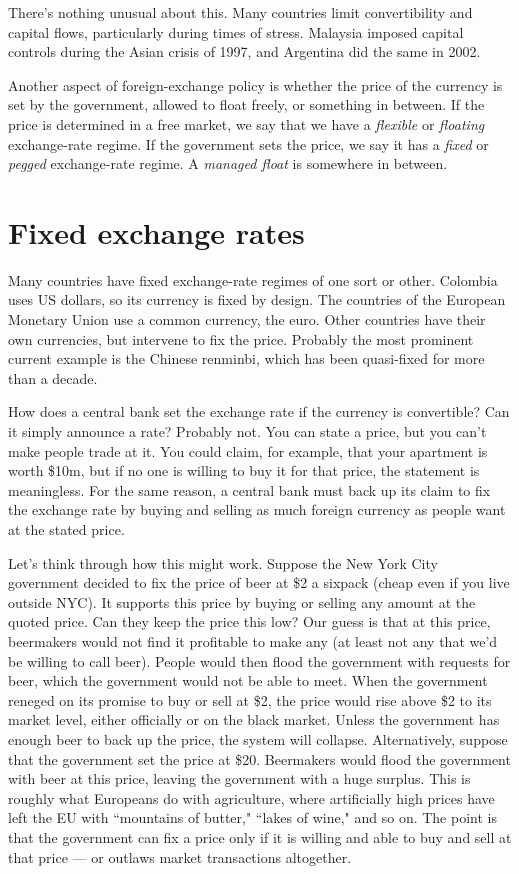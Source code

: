 There's nothing unusual about this.
Many countries limit convertibility and capital flows,
particularly during times of stress.
Malaysia imposed capital controls during the Asian crisis of 1997,
and Argentina did the same in 2002.

Another aspect of foreign-exchange policy
is whether the price of the currency is set by the government,
allowed to float freely, or something in between.
If the price is determined in a free market, we say that we have a
{\it flexible\/} or {\it floating\/} exchange-rate regime.
If the government sets the price, we say it has a
{\it fixed\/} or {\it pegged\/} exchange-rate regime.
A {\it managed float\/} is somewhere in between.


\section{Fixed exchange rates}

Many countries have fixed exchange-rate regimes of one sort or other.
Colombia uses US dollars, so its currency is fixed by design. %
The countries of the European Monetary Union use a common currency, the euro.
Other countries have their own currencies, but intervene to
fix the price.
Probably the most prominent current example is the Chinese renminbi,
which has been quasi-fixed for more than a decade.


How does a central bank set the exchange rate if the currency
 is convertible?
Can it simply announce a rate?
Probably not.
You can state a price, but you can't make people trade at it.
You could claim, for example, that your apartment is worth
\$10m, but if no one is willing to buy it for that price,
the statement is meaningless.
For the same reason, a central bank must back up its
claim to fix the exchange rate by buying and selling as much
foreign currency as people want at the stated price.


Let's think through how this might work.
Suppose the New York City government decided to fix the price of beer at \$2 a sixpack (cheap even if you live outside NYC).
It supports this price by buying or selling
any amount at the quoted price.  Can they keep the price this low?
Our guess is that at this price,
beermakers would not find it profitable to make any
(at least not any that we'd be willing to call beer).  People would then flood the government with requests for beer, which the government would
not be able to meet.  When the government reneged on its promise to buy or sell at \$2, the price
would rise above \$2 to its market level, either officially or on the black market.
Unless the government has enough beer to back up the price,
the system will collapse.
Alternatively, suppose that the government set the price at \$20.
Beermakers would flood the government with beer at this price, leaving the
government with a huge surplus.  This is roughly what Europeans do with agriculture, where artificially high prices have left the EU with
``mountains of butter," ``lakes of wine," and so on.
The point is that the government can fix a price
only if it is willing and able to buy and sell at that price --- or outlaws market transactions altogether.

